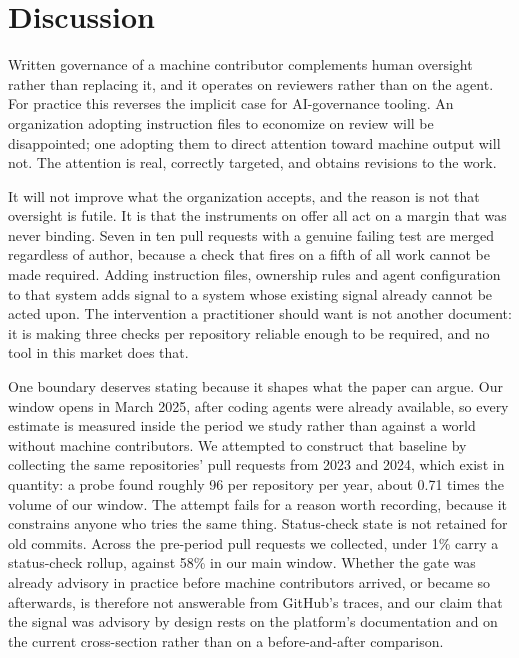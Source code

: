 \documentclass[mnsc]{informs4}
\begin{document}
\section{Discussion}
\label{sec:discussion}

Written governance of a machine contributor complements human oversight rather than
replacing it, and it operates on reviewers rather than on the agent. For practice
this reverses the implicit case for AI-governance tooling. An organization adopting
instruction files to economize on review will be disappointed; one adopting them to
direct attention toward machine output will not. The attention is real, correctly
targeted, and obtains revisions to the work.

It will not improve what the organization accepts, and the reason is not that
oversight is futile. It is that the instruments on offer all act on a margin that
was never binding. Seven in ten pull requests with a genuine failing test are
merged regardless of author, because a check that fires on a fifth of all work
cannot be made required. Adding instruction files, ownership rules and agent
configuration to that system adds signal to a system whose existing signal already
cannot be acted upon. The intervention a practitioner should want is not another
document: it is making three checks per repository reliable enough to be required,
and no tool in this market does that.

One boundary deserves stating because it shapes what the paper can argue. Our
window opens in March 2025, after coding agents were already available, so every
estimate is measured inside the period we study rather than against a world
without machine contributors. We attempted to construct that baseline by
collecting the same repositories' pull requests from 2023 and 2024, which exist in
quantity: a probe found roughly 96 per repository per year, about 0.71 times the
volume of our window. The attempt fails for a reason worth recording, because it
constrains anyone who tries the same thing. Status-check state is not retained for
old commits. Across the pre-period pull requests we collected, under 1\% carry a
status-check rollup, against 58\% in our main window. Whether the gate was already
advisory in practice before machine contributors arrived, or became so afterwards,
is therefore not answerable from GitHub's traces, and our claim that the signal was
advisory by design rests on the platform's documentation and on the current
cross-section rather than on a before-and-after comparison.
\end{document}
